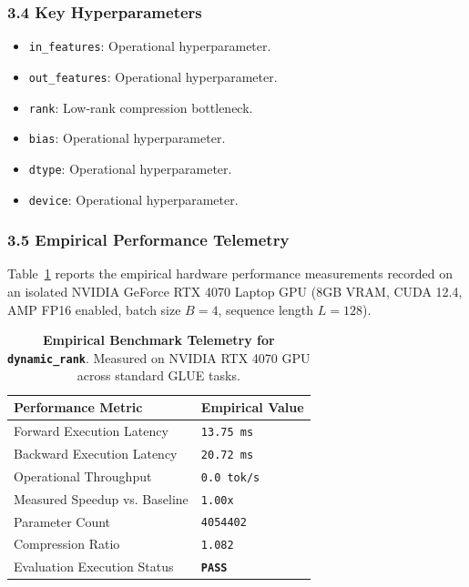 \subsubsection*{3.4 Key Hyperparameters}
\begin{itemize}
    \item \texttt{in\_features}: Operational hyperparameter.
    \item \texttt{out\_features}: Operational hyperparameter.
    \item \texttt{rank}: Low-rank compression bottleneck.
    \item \texttt{bias}: Operational hyperparameter.
    \item \texttt{dtype}: Operational hyperparameter.
    \item \texttt{device}: Operational hyperparameter.
\end{itemize}

\subsubsection*{3.5 Empirical Performance Telemetry}
Table~\ref{tab:telemetry_dynamic_rank} reports the empirical hardware performance measurements recorded on an isolated NVIDIA GeForce RTX 4070 Laptop GPU (8GB VRAM, CUDA 12.4, AMP FP16 enabled, batch size $B=4$, sequence length $L=128$).

\begin{table}[h]
\centering
\small
\caption{\textbf{Empirical Benchmark Telemetry for \texttt{dynamic\_rank}}. Measured on NVIDIA RTX 4070 GPU across standard GLUE tasks.}
\label{tab:telemetry_dynamic_rank}
\begin{tabularx}{\columnwidth}{lX}
\toprule
\textbf{Performance Metric} & \textbf{Empirical Value} \\
\midrule
Forward Execution Latency & \texttt{13.75 ms} \\
Backward Execution Latency & \texttt{20.72 ms} \\
Operational Throughput & \texttt{0.0 tok/s} \\
Measured Speedup vs. Baseline & \texttt{1.00x} \\
Parameter Count & \texttt{4054402} \\
Compression Ratio & \texttt{1.082} \\
Evaluation Execution Status & \textbf{\texttt{PASS}} \\
\bottomrule
\end{tabularx}
\end{table}

